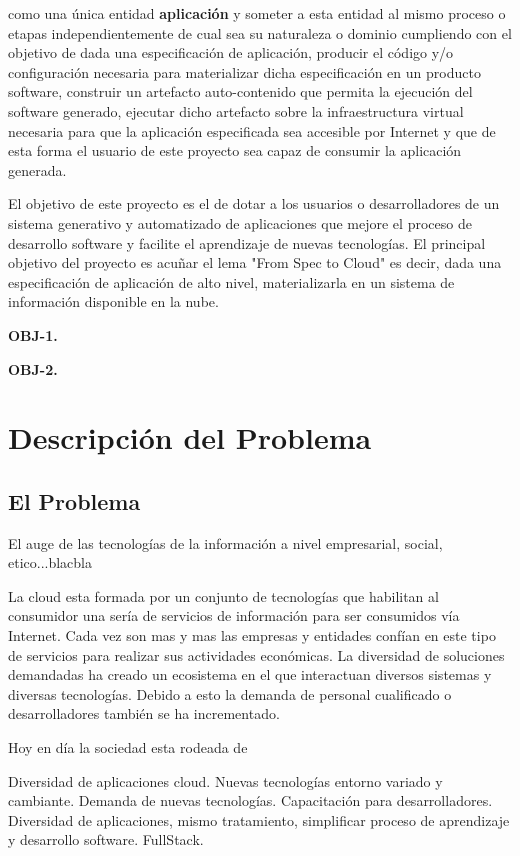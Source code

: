 \documentclass[a4paper,11pt]{book}
\begin{document}
como una única  entidad \textbf{aplicación} y  someter a esta entidad al mismo proceso o etapas independientemente de cual sea su naturaleza o dominio cumpliendo con el objetivo de dada una especificación de aplicación, producir el código y/o configuración necesaria para materializar dicha especificación en un producto software, construir un artefacto auto-contenido que permita la ejecución del software generado, ejecutar dicho artefacto sobre la infraestructura virtual necesaria para que la aplicación especificada sea accesible por Internet y que de esta forma el usuario de este proyecto sea capaz de consumir la aplicación generada.  
 
El objetivo de este proyecto es el de dotar a los usuarios o desarrolladores de un  sistema  generativo y automatizado de aplicaciones que mejore el proceso de desarrollo software y facilite el aprendizaje de nuevas tecnologías. El principal objetivo del proyecto es acuñar el lema "From Spec to Cloud" es decir, dada una especificación de aplicación de alto nivel, materializarla en un sistema de información disponible en la nube. 

 

\textbf{OBJ-1.} 

\textbf{OBJ-2.}

\chapter{Descripción del Problema}

\section{El Problema}

El auge de las tecnologías de la información a nivel empresarial, social, etico...blacbla


La cloud esta formada por un conjunto de tecnologías que habilitan al consumidor una sería de servicios de información para ser consumidos vía Internet. Cada vez son mas y mas las empresas y entidades confían en este tipo de servicios para realizar sus actividades económicas. La diversidad de soluciones demandadas ha creado un ecosistema en el que interactuan diversos sistemas y diversas tecnologías. Debido a esto la demanda de personal cualificado o desarrolladores también se ha incrementado. 

Hoy en día la sociedad esta rodeada de 


Diversidad de aplicaciones cloud. Nuevas tecnologías entorno variado y cambiante. Demanda de nuevas tecnologías.
Capacitación para desarrolladores. Diversidad de aplicaciones, mismo tratamiento, simplificar proceso de aprendizaje y desarrollo software. FullStack. 
\end{document}
